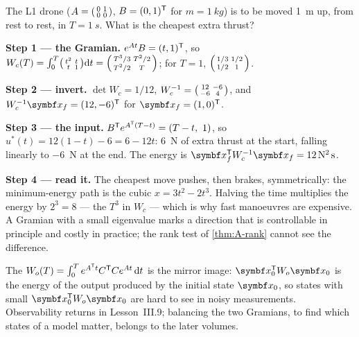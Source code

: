 \begin{example}
\label{ex:I-gram}
The L1 drone ($A = \begin{psmallmatrix}0 & 1\\ 0 & 0\end{psmallmatrix}$, $B = (0, 1)^{\mathsf{T}}$ for $m = \SI{1}{kg}$) is to be moved \SI{1}{m} up, from rest to rest, in $T = \SI{1}{s}$. What is the cheapest extra thrust?

\textbf{Step 1 — the Gramian.} $e^{At}B = (t, 1)^{\mathsf{T}}$, so $W_c(T) = \int_0^T\begin{psmallmatrix}t^2 & t\\ t & 1\end{psmallmatrix}\mathrm{d} t = \begin{psmallmatrix}T^3/3 & T^2/2\\ T^2/2 & T\end{psmallmatrix}$; for $T = 1$, $\begin{psmallmatrix}1/3 & 1/2\\ 1/2 & 1\end{psmallmatrix}$.

\textbf{Step 2 — invert.} $\det W_c = 1/12$, $W_c^{-1} = \begin{psmallmatrix}12 & -6\\ -6 & 4\end{psmallmatrix}$, and $W_c^{-1}\vx_f = (12, -6)^\T$ for $\vx_f = (1, 0)^\T$.

\textbf{Step 3 — the input.} $B^{\mathsf{T}} e^{A^{\mathsf{T}}(T-t)} = (T - t,\ 1)$, so $u^*(t) = 12(1 - t) - 6 = 6 - 12t$: \SI{6}{N} of extra thrust at the start, falling linearly to \SI{-6}{N} at the end. The energy is $\vx_f^\T W_c^{-1}\vx_f = \SI{12}{N^2.s}$.

\textbf{Step 4 — read it.} The cheapest move pushes, then brakes, symmetrically: the minimum-energy path is the cubic $x = 3t^2 - 2t^3$. Halving the time multiplies the energy by $2^3 = 8$ — the $T^3$ in $W_c$ — which is why fast manoeuvres are expensive. A Gramian with a small eigenvalue marks a direction that is controllable in principle and costly in practice; the rank test of \cref{thm:A-rank} cannot see the difference.
\end{example}

The  $W_o(T) = \int_0^Te^{A^{\mathsf{T}} t}C^{\mathsf{T}} Ce^{At}\,\mathrm{d} t$ is the mirror image: $\vx_0^\T W_o\vx_0$ is the energy of the output produced by the initial state $\vx_0$, so states with small $\vx_0^\T W_o\vx_0$ are hard to see in noisy measurements. Observability returns in Lesson~III.9; balancing the two Gramians, to find which states of a model matter, belongs to the later volumes.


